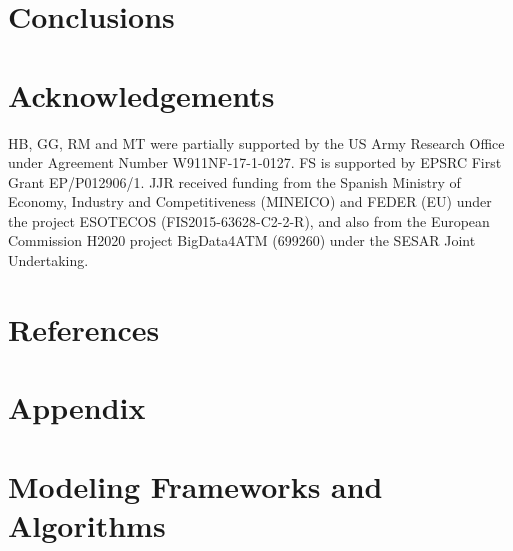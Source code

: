 \documentclass[preprint, times]{elsarticle}
\begin{document}
\section{Conclusions}
\label{sec:conclusion}


\section*{Acknowledgements}
HB, GG, RM and MT were partially supported by the US Army Research Office under Agreement Number W911NF-17-1-0127. FS is supported by EPSRC First Grant EP/P012906/1. JJR received funding from the Spanish Ministry of Economy, Industry and Competitiveness (MINEICO) and FEDER (EU) under the project ESOTECOS (FIS2015-63628-C2-2-R), and also from the European Commission H2020 project BigData4ATM (699260) under the SESAR Joint Undertaking. 


\section{References}

 
% 


\appendix
\renewcommand*{\thesection}{\Alph{section}}

\section*{Appendix}
\section{Modeling Frameworks and Algorithms}
\label{sec:comp}


\newpage
\end{document}
